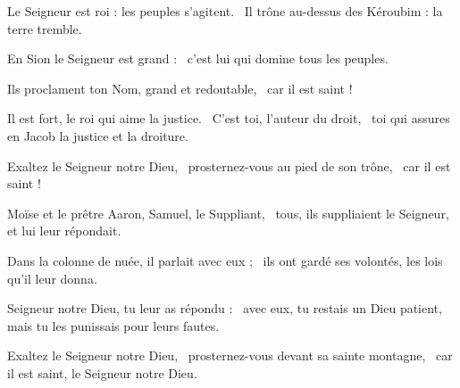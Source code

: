 \item Le Seigneur est roi : les peuples s'agitent.~\psstar{} Il trône au-dessus des Kéroubim : la terre tremble.
\item En Sion le Seigneur est grand :~\psstar{} c'est lui qui domine tous les peuples.
\item Ils proclament ton Nom, grand et redoutable,~\psstar{} car il est saint !
\item Il est fort, le roi qui aime la justice.~\pscross{} C'est toi, l'auteur du droit,~\psstar{} toi qui assures en Jacob la justice et la droiture.
\item Exaltez le Seigneur notre Dieu,~\pscross{} prosternez-vous au pied de son trône,~\psstar{} car il est saint !
\item Moïse et le prêtre Aaron, Samuel, le Suppliant,~\pscross{} tous, ils suppliaient le Seigneur,~\psstar{} et lui leur répondait.
\item Dans la colonne de nuée, il parlait avec eux ;~\psstar{} ils ont gardé ses volontés, les lois qu'il leur donna.
\item Seigneur notre Dieu, tu leur as répondu :~\pscross{} avec eux, tu restais un Dieu patient,~\psstar{} mais tu les punissais pour leurs fautes.
\item Exaltez le Seigneur notre Dieu,~\pscross{} prosternez-vous devant sa sainte montagne,~\psstar{} car il est saint, le Seigneur notre Dieu.